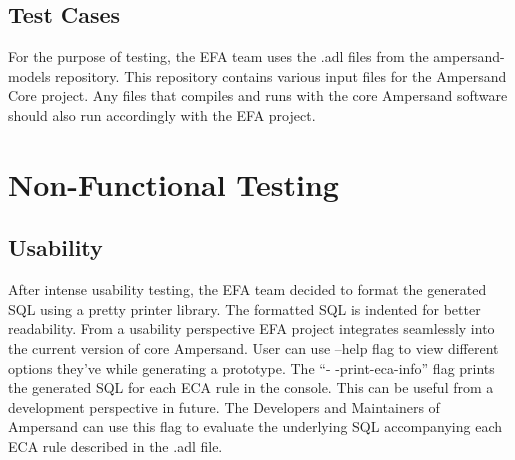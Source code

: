 \documentclass[12pt, svgnames]{article}
\begin{document}
\subsection{Test Cases}
For the purpose of testing, the EFA team uses the .adl files from the ampersand-models repository. This repository contains various input files for the Ampersand Core project. Any files that compiles and runs with the core Ampersand software should also run accordingly with the EFA project.

\section{Non-Functional Testing}

\subsection{Usability}
After intense usability testing, the EFA team decided to format the generated SQL using a pretty printer library. The formatted SQL is indented for better readability. 
From a usability perspective EFA project integrates seamlessly into the current version of core Ampersand. User can use --help flag to view different options they've while generating a prototype. The ``- -print-eca-info'' flag prints the generated SQL for each ECA rule in the console. This can be useful from a development perspective in future. The Developers and Maintainers of Ampersand can use this flag to evaluate the underlying SQL accompanying each ECA rule described in the .adl file.

\end{document}
